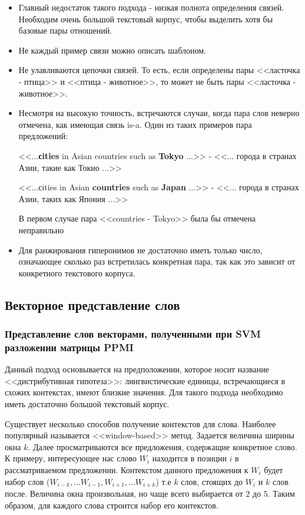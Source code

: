 \begin{itemize}
\item Главный недостаток такого подхода - низкая полнота определения связей. Необходим
очень большой текстовый корпус, чтобы выделить хотя бы базовые пары отношений.

\item Не каждый пример связи можно описать шаблоном.

\item Не улавливаются цепочки связей. То есть, если определены пары <<ласточка - птица>> и
<<птица - животное>>, то может не быть пары <<ласточка - животное>>.
\item Несмотря на высокую точность, встречаются случаи, когда пара слов неверно отмечена,
как имеющая связь is-a. Один из таких примеров пара предложений:

<<...\textbf{сities} in Asian countries such as \textbf{Tokyo} ...>> - <<... города в странах Азии, такие как Токио
...>>

<<...сities in Asian \textbf{countries} such as \textbf{Japan} ...>> - <<... города в странах Азии, таких как
Япония ...>>

В первом случае пара <<countries - Tokyo>> была бы отмечена неправильно

\item Для ранжирования гиперонимов не достаточно иметь только число, означающее сколько
раз встретилась конкретная пара, так как это зависит от конкретного текстового
корпуса.
\end{itemize}

\subsection{Векторное представление слов}

\subsubsection{Представление слов векторами, полученными при SVM разложении матрицы PPMI}

Данный подход основывается на предположении, которое носит название
<<дистрибутивная гипотеза>>: лингвистические единицы, встречающиеся в схожих
контекстах, имеют близкие значения. Для такого подхода необходимо иметь достаточно
большой текстовый корпус.

Существует несколько способов получение контекстов для слова. Наиболее популярный
называется <<window-based>> метод. Задается величина ширины окна $k$. Далее
просматриваются все предложения, содержащие конкретное слово. К примеру,
интересующее нас слово $W_i$ находится в позиции $i$ в рассматриваемом предложении.
Контекстом данного предложения к $W_i$ будет набор слов ($W_{i-k}, \ldots W_{i-1}, W_{i+1}, \ldots W_{i+k}$) т.е $k$
слов, стоящих до $W_i$ и $k$ слов после. Величина окна произвольная, но чаще всего
выбирается от $2$ до $5$. Таким образом, для каждого слова строится набор его контекстов.

